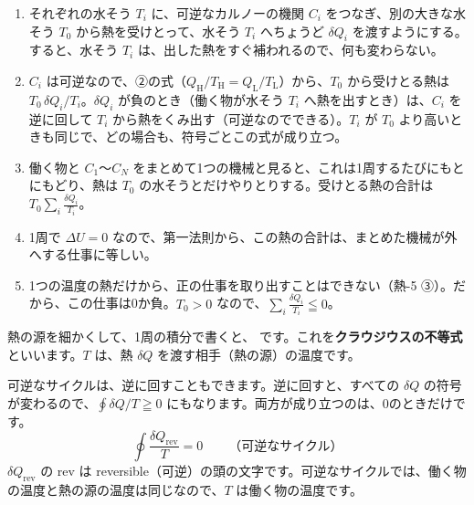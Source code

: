 \begin{enumerate}[label={\bkcircled{\arabic*}}, leftmargin=2.4\zw, itemsep=1pt, topsep=2pt]
\item それぞれの水そう $T_i$ に、可逆なカルノーの機関 $C_i$ をつなぎ、別の大きな水そう $T_0$ から熱を受けとって、水そう $T_i$ へちょうど $\delta Q_i$ を渡すようにする。すると、水そう $T_i$ は、出した熱をすぐ補われるので、何も変わらない。
\item $C_i$ は可逆なので、②の式（$Q_{\mathrm H}/T_{\mathrm H}=Q_{\mathrm L}/T_{\mathrm L}$）から、$T_0$ から受けとる熱は $T_0\,\delta Q_i/T_i$。$\delta Q_i$ が負のとき（働く物が水そう $T_i$ へ熱を出すとき）は、$C_i$ を逆に回して $T_i$ から熱をくみ出す（可逆なのでできる）。$T_i$ が $T_0$ より高いときも同じで、どの場合も、符号ごとこの式が成り立つ。
\item 働く物と $C_1$〜$C_N$ をまとめて1つの機械と見ると、これは1周するたびにもとにもどり、熱は $T_0$ の水そうとだけやりとりする。受けとる熱の合計は $T_0\displaystyle\sum_i\frac{\delta Q_i}{T_i}$。
\item 1周で $\Delta U=0$ なので、第一法則から、この熱の合計は、まとめた機械が外へする仕事に等しい。
\item 1つの温度の熱だけから、正の仕事を取り出すことはできない（熱-5 ③）。だから、この仕事は0か負。$T_0>0$ なので、$\displaystyle\sum_i\frac{\delta Q_i}{T_i}\leqq0$。
\end{enumerate}
熱の源を細かくして、1周の積分で書くと、
です。これを\textbf{クラウジウスの不等式}といいます。$T$ は、熱 $\delta Q$ を渡す相手（熱の源）の温度です。

可逆なサイクルは、逆に回すこともできます。逆に回すと、すべての $\delta Q$ の符号が変わるので、$\oint\delta Q/T\geqq0$ にもなります。両方が成り立つのは、0のときだけです。
\[\oint\frac{\delta Q_{\mathrm{rev}}}{T}=0\qquad\text{（可逆なサイクル）}\]
$\delta Q_{\mathrm{rev}}$ の rev は reversible（可逆）の頭の文字です。可逆なサイクルでは、働く物の温度と熱の源の温度は同じなので、$T$ は働く物の温度です。

